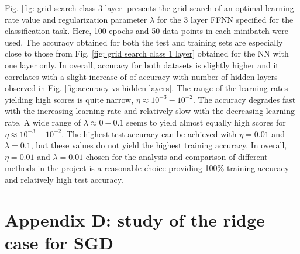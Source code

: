 \documentclass{emulateapj}
\begin{document}
Fig. \ref{fig: grid search class 3 layer} presents the grid search of an optimal learning rate value and regularization parameter $\lambda$ for the 3 layer FFNN specified for the classification task. Here, 100 epochs and 50 data points in each minibatch were used. The accuracy obtained for both the test and training sets are especially close to those from Fig. \ref{fig: grid search class 1 layer} obtained for the NN with one layer only. In overall, accuracy for both datasets is slightly higher and it correlates with a slight increase of of accuracy with number of hidden layers observed in Fig. \ref{fig:accuracy vs hidden layers}. The range of the learning rates yielding high scores is quite narrow, $\eta\approx10^{-3}-10^{-2}$. The accuracy degrades fast with the increasing learning rate and relatively slow with the decreasing learning rate. A wide range of $\lambda\approx0-0.1$ seems to yield almost equally high scores for $\eta\approx10^{-3}-10^{-2}$. The highest test accuracy can be achieved with $\eta=0.01$ and $\lambda=0.1$, but these values do not yield the highest training accuracy. In overall, $\eta=0.01$ and $\lambda=0.01$ chosen for the analysis and comparison of different methods in the project is a reasonable choice providing 100\% training accuracy and relatively high test accuracy. 

\section{Appendix D: study of the ridge case for SGD}
\label{Appendix:D}
\end{document}
